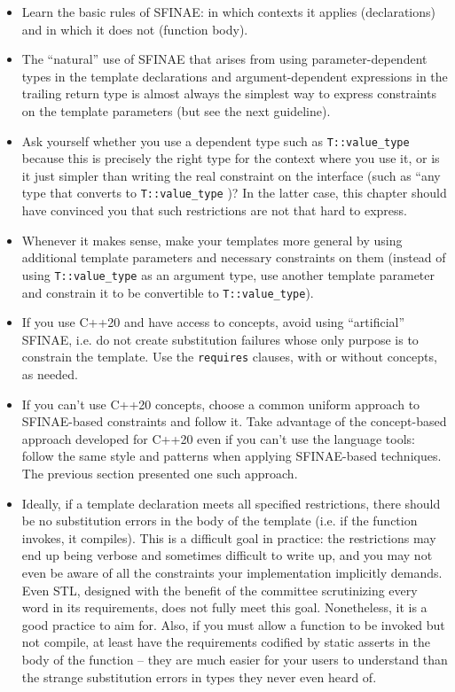 \begin{itemize}
\item
  Learn the basic rules of SFINAE: in which contexts it applies (declarations) and in which it does not (function body).
\item
  The ``natural'' use of SFINAE that arises from using parameter-dependent types in the template declarations and argument-dependent expressions in the trailing return type is almost always the simplest way to express constraints on the template parameters (but see the next guideline).
\item
  Ask yourself whether you use a dependent type such as \texttt{T::value\_type} because this is precisely the right type for the context where you use it, or is it just simpler than writing the real constraint on the interface (such as ``any type that converts to \texttt{T::value\_type} )? In the latter case, this chapter should have convinced you that such restrictions are not that hard to express.
\item
  Whenever it makes sense, make your templates more general by using additional template parameters and necessary constraints on them (instead of using \texttt{T::value\_type} as an argument type, use another template parameter and constrain it to be convertible to \texttt{T::value\_type}).
\item
  If you use C++20 and have access to concepts, avoid using ``artificial'' SFINAE, i.e. do not create substitution failures whose only purpose is to constrain the template. Use the \texttt{requires} clauses, with or without concepts, as needed.
\item
  If you can't use C++20 concepts, choose a common uniform approach to SFINAE-based constraints and follow it. Take advantage of the concept-based approach developed for C++20 even if you can't use the language tools: follow the same style and patterns when applying SFINAE-based techniques. The previous section presented one such approach.
\item
  Ideally, if a template declaration meets all specified restrictions, there should be no substitution errors in the body of the template (i.e. if the function invokes, it compiles). This is a difficult goal in practice: the restrictions may end up being verbose and sometimes difficult to write up, and you may not even be aware of all the constraints your implementation implicitly demands. Even STL, designed with the benefit of the committee scrutinizing every word in its requirements, does not fully meet this goal. Nonetheless, it is a good practice to aim for. Also, if you must allow a function to be invoked but not compile, at least have the requirements codified by static asserts in the body of the function -- they are much easier for your users to understand than the strange substitution errors in types they never even heard of.
\end{itemize}

